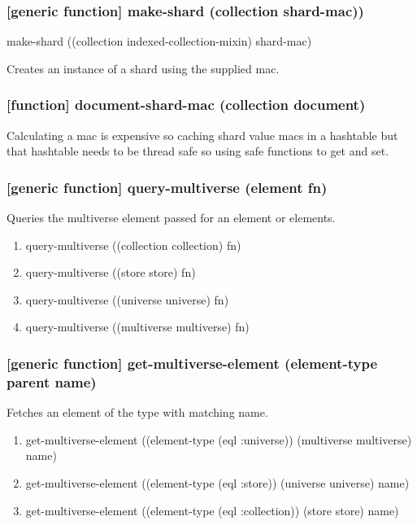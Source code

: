 \documentclass[11pt]{article}
\begin{document}
\subsubsection{[generic function] make-shard (collection shard-mac))}
\label{sec:org1d1d1b9}
make-shard ((collection indexed-collection-mixin) shard-mac)

Creates an instance of a shard using the supplied mac.

\subsubsection{[function] document-shard-mac (collection document)}
\label{sec:org78ef40c}

Calculating a mac is expensive so caching shard value macs in a
hashtable but that hashtable needs to be thread safe so using safe
functions to get and set.

\subsubsection{[generic function] query-multiverse (element fn)}
\label{sec:org4d92c30}

Queries the multiverse element passed for an element or elements.

\begin{enumerate}
\item query-multiverse ((collection collection) fn)
\label{sec:orgb466a1a}

\item query-multiverse ((store store) fn)
\label{sec:org390514d}

\item query-multiverse ((universe universe) fn)
\label{sec:orge4b8e3d}

\item query-multiverse ((multiverse multiverse) fn)
\label{sec:org5d35d93}
\end{enumerate}

\subsubsection{[generic function] get-multiverse-element (element-type parent name)}
\label{sec:org1b8c249}

Fetches an element of the type with matching name.

\begin{enumerate}
\item get-multiverse-element ((element-type (eql :universe)) (multiverse multiverse) name)
\label{sec:org62400c5}

\item get-multiverse-element ((element-type (eql :store)) (universe universe) name)
\label{sec:orgd1c8332}

\item get-multiverse-element ((element-type (eql :collection)) (store store) name)
\label{sec:org201639f}
\end{enumerate}
\end{document}
